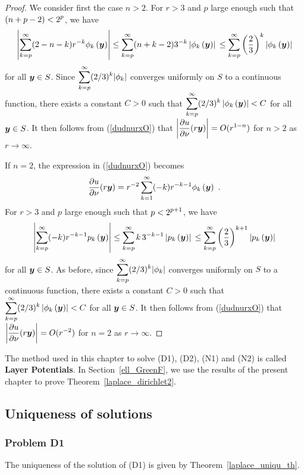\begin{proof}
 We consider first the case $n>2$.  For $r>3$ and $p$ large
enough such that $\displaystyle (n+p-2) < 2^p$, we have
\[
\left| \sum_{k=p}^{\infty} (2-n-k) r^{-k} \phi_k\left({\bm{y}}\right) \right|
\leq \sum_{k=p}^{\infty} (n+k-2) 3^{-k}
\left| \phi_k\left({\bm{y}}\right) \right| \\
\leq \sum_{k=p}^{\infty} \left(\frac{2}{3}\right)^k
\left| \phi_k\left({\bm{y}}\right) \right|
\]
for all ${\bm{y}} \in S$.  Since
$\displaystyle \sum_{k=p}^{\infty} (2/3)^k |\phi_k|$
converges uniformly on $S$ to a continuous function, there exists a
constant $C>0$ such that
$\displaystyle \sum_{k=p}^{\infty} (2/3)^k \left|
  \phi_k\left({\bm{y}}\right) \right| < C$
for all ${\bm{y}} \in S$.  It then follows
from (\ref{dudnurxO}) that
$\displaystyle \left| \frac{\partial{u}}{\partial \nu}(r {\bm{y}}) \right| = O(r^{1-n})$
for $n>2$ as $r \to \infty$.

 If $n=2$, the expression in (\ref{dudnurxO}) becomes
\[
\pdydx{u}{\nu}(r \VEC{y})  
= r^{-2} \sum_{k=1}^\infty (-k) r^{-k-1} \phi_k\left(\VEC{y}\right) \ .
\]
For $r>3$ and $p$ large enough such that $\displaystyle p < 2^{p+1}$,
we have
\[
\left| \sum_{k=p}^{\infty} (-k) r^{-k-1} p_k\left({\bm{y}}\right) \right|
\leq \sum_{k=p}^{\infty} k\, 3^{-k-1} \left| p_k\left({\bm{y}}\right) \right| \\
\leq \sum_{k=p}^{\infty} \left(\frac{2}{3}\right)^{k+1}
\left| p_k\left({\bm{y}}\right) \right|
\]
for all ${\bm{y}} \in S$.  As before, since
$\displaystyle \sum_{k=p}^{\infty} (2/3)^k |\phi_k|$
converges uniformly on $S$ to a continuous function, there exists a
constant $C>0$ such that
$\displaystyle \sum_{k=p}^{\infty} (2/3)^k \left|
  \phi_k\left({\bm{y}}\right) \right| < C$
for all ${\bm{y}} \in S$.  It then follows
from (\ref{dudnurxO}) that
$\displaystyle \left| \frac{\partial{u}}{\partial \nu}(r {\bm{y}}) \right| = O(r^{-2})$
for $n=2$ as $r \to \infty$.
\end{proof}

\begin{rmk}
The method used in this chapter to solve (D1), (D2), (N1) and (N2) is called
{\bfseries Layer Potentials}.
In Section~\ref{ell_GreenF}, we use the results of the present chapter
to prove Theorem~\ref{laplace_dirichlet2}.
\end{rmk}

\subsection{Uniqueness of solutions} \label{pot_sect_unique}

\subsubsection{Problem D1}
The uniqueness of the solution of (D1) is given by
Theorem~\ref{laplace_uniqu_th}.

